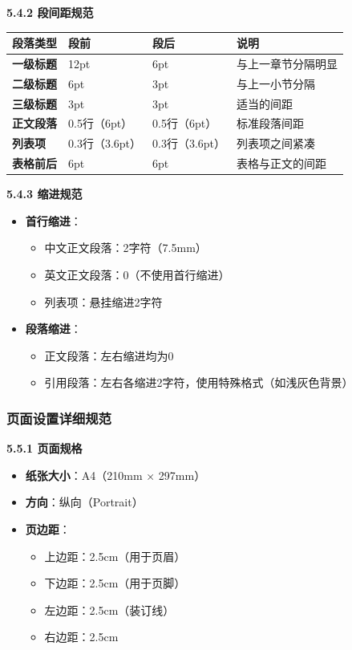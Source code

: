 \documentclass[12pt,a4paper]{article}
\numberwithin{equation}{section}  %
\begin{document}
\textbf{5.4.2 段间距规范}

\begin{longtable}{|p{3cm}|p{4cm}|p{4cm}|p{3cm}|}
\hline
段落类型 & 段前 & 段后 & 说明 \\
\hline
\textbf{一级标题} & 12pt & 6pt & 与上一章节分隔明显 \\
\textbf{二级标题} & 6pt & 3pt & 与上一小节分隔 \\
\textbf{三级标题} & 3pt & 3pt & 适当的间距 \\
\textbf{正文段落} & 0.5行（6pt） & 0.5行（6pt） & 标准段落间距 \\
\textbf{列表项} & 0.3行（3.6pt） & 0.3行（3.6pt） & 列表项之间紧凑 \\
\textbf{表格前后} & 6pt & 6pt & 表格与正文的间距 \\
\hline
\end{longtable}

\textbf{5.4.3 缩进规范}

\begin{itemize}
\item \textbf{首行缩进}：
\begin{itemize}
\item 中文正文段落：2字符（7.5mm）
\item 英文正文段落：0（不使用首行缩进）
\item 列表项：悬挂缩进2字符

\end{itemize}
\item \textbf{段落缩进}：
\begin{itemize}
\item 正文段落：左右缩进均为0
\item 引用段落：左右各缩进2字符，使用特殊格式（如浅灰色背景）
\end{itemize}
\end{itemize}

\subsubsection{页面设置详细规范}
\textbf{5.5.1 页面规格}

\begin{itemize}
\item \textbf{纸张大小}：A4（210mm × 297mm）
\item \textbf{方向}：纵向（Portrait）
\item \textbf{页边距}：
\begin{itemize}
\item 上边距：2.5cm（用于页眉）
\item 下边距：2.5cm（用于页脚）
\item 左边距：2.5cm（装订线）
\item 右边距：2.5cm
\end{itemize}
\end{itemize}
\end{document}
